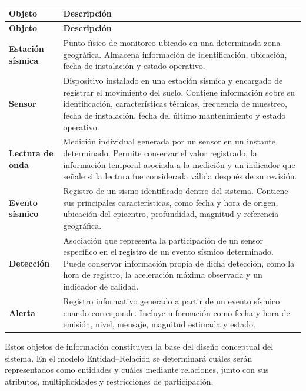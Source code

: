 \documentclass[12pt,a4paper]{article}
\begin{document}
\begin{longtable}{p{3.5cm} p{10cm}}
\toprule
\textbf{Objeto} & \textbf{Descripción} \\
\midrule
\endfirsthead

\toprule
\textbf{Objeto} & \textbf{Descripción} \\
\midrule
\endhead

\textbf{Estación sísmica} &
Punto físico de monitoreo ubicado en una determinada zona geográfica. Almacena información de identificación, ubicación, fecha de instalación y estado operativo. \\[0.3cm]

\textbf{Sensor} &
Dispositivo instalado en una estación sísmica y encargado de registrar el movimiento del suelo. Contiene información sobre su identificación, características técnicas, frecuencia de muestreo, fecha de instalación, fecha del último mantenimiento y estado operativo. \\[0.3cm]

\textbf{Lectura de onda} &
Medición individual generada por un sensor en un instante determinado. Permite conservar el valor registrado, la información temporal asociada a la medición y un indicador que señale si la lectura fue considerada válida después de su revisión. \\[0.3cm]

\textbf{Evento sísmico} &
Registro de un sismo identificado dentro del sistema. Contiene sus principales características, como fecha y hora de origen, ubicación del epicentro, profundidad, magnitud y referencia geográfica. \\[0.3cm]

\textbf{Detección} &
Asociación que representa la participación de un sensor específico en el registro de un evento sísmico determinado. Puede conservar información propia de dicha detección, como la hora de registro, la aceleración máxima observada y un indicador de calidad. \\[0.3cm]

\textbf{Alerta} &
Registro informativo generado a partir de un evento sísmico cuando corresponde. Incluye información como fecha y hora de emisión, nivel, mensaje, magnitud estimada y estado. \\

\bottomrule
\end{longtable}

Estos objetos de información constituyen la base del diseño conceptual del sistema. En el modelo Entidad--Relación se determinará cuáles serán representados como entidades y cuáles mediante relaciones, junto con sus atributos, multiplicidades y restricciones de participación.
\end{document}
